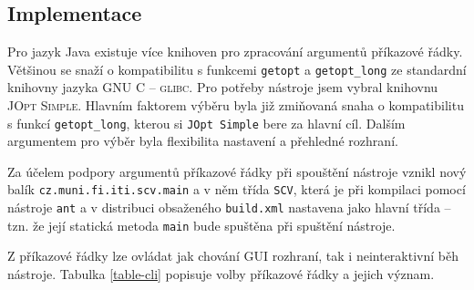 \documentclass[11pt,final,oneside]{fithesis}
\begin{document}
\subsection{Implementace}
Pro jazyk Java existuje více knihoven pro zpracování argumentů příkazové řádky. Většinou se snaží o kompatibilitu s funkcemi \texttt{getopt} a \texttt{getopt\_long} ze standardní knihovny jazyka GNU C -- \textsc{glibc}\cite{glibc}. Pro potřeby nástroje jsem vybral knihovnu \textsc{JOpt Simple}\cite{joptsimple}. Hlavním faktorem výběru byla již zmiňovaná snaha o kompatibilitu s funkcí \texttt{getopt\_long}, kterou si \texttt{JOpt Simple} bere za hlavní cíl. Dalším argumentem pro výběr byla flexibilita nastavení a přehledné rozhraní.
 
Za účelem podpory argumentů příkazové řádky při spouštění nástroje vznikl nový balík \verb|cz.muni.fi.iti.scv.main| a v něm třída \verb|SCV|, která je při kompilaci pomocí nástroje \verb|ant| a v distribuci obsaženého \verb|build.xml| nastavena jako hlavní třída -- tzn. že její statická metoda \verb|main| bude spuštěna při spuštění nástroje.

Z příkazové řádky lze ovládat jak chování GUI rozhraní, tak i neinteraktivní běh nástroje. Tabulka \ref{table-cli} popisuje volby příkazové řádky a jejich význam.
\end{document}
